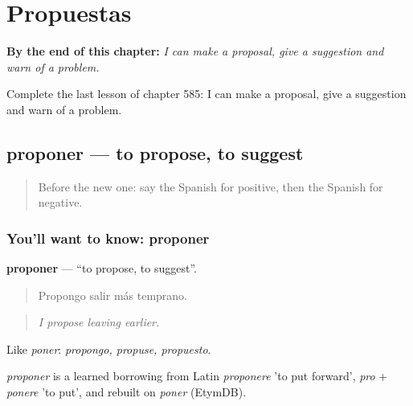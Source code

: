 
\chapter{Propuestas}
\label{ch:es-propuestas}

\begin{chapteropening}
\textbf{By the end of this chapter:} \emph{I can make a proposal, give a suggestion and warn of a problem.}

Complete the last lesson of chapter 585: I can make a proposal, give a suggestion and warn of a problem.
\end{chapteropening}

\section[proponer]{proponer — to propose, to suggest}

\label{lesson:ES-C585-proponer}



\begin{quote}
Before the new one: say the Spanish for positive, then the Spanish for negative.
\end{quote}

\subsection*{You'll want to know: proponer}
\textbf{proponer} — \textquotedblleft{}to propose, to suggest\textquotedblright{}.

\begin{quote}
Propongo salir más temprano.
\end{quote}

\begin{quote}
\emph{I propose leaving earlier.}
\end{quote}

Like \emph{poner}: \emph{propongo, propuse, propuesto}.

\begin{cousinweb}
\emph{proponer} is a learned borrowing from Latin \emph{proponere} 'to put forward', \emph{pro} + \emph{ponere} 'to put', and rebuilt on \emph{poner} (EtymDB).
\end{cousinweb}

